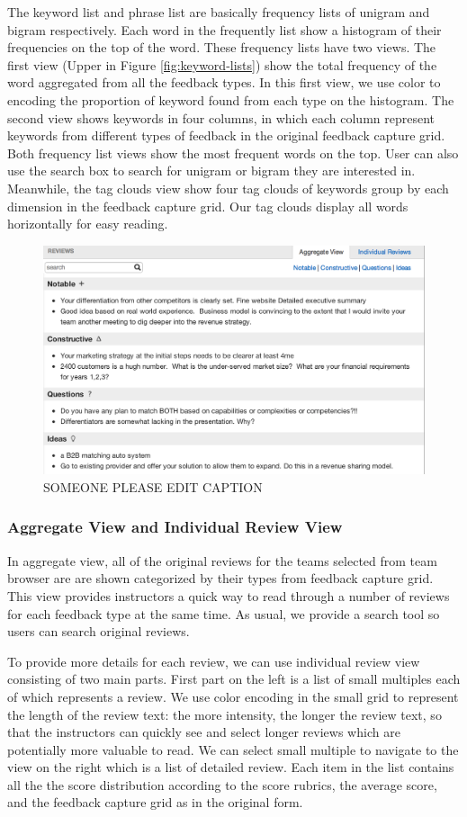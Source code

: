 \documentclass{sigchi}
\begin{document}
The keyword list and phrase list are basically frequency lists of unigram and
bigram respectively.  Each word in the frequently list show a histogram of their
frequencies on the top of the word.  These frequency lists have two views.  The
first view (Upper in Figure \ref{fig:keyword-lists}) show the total frequency of the
word aggregated from all the feedback types.  In this first view, we use color
to encoding the proportion of keyword found from each type on the histogram.
The second view shows keywords in four columns, in which each column represent
keywords from different types of feedback in the original feedback capture grid.
Both frequency list views show the most frequent words on the top.  User can
also use the search box to search for unigram or bigram they are interested in.
Meanwhile, the tag clouds view show four tag clouds of keywords group by each
dimension in the feedback capture grid.  Our tag clouds display all words
horizontally for easy reading.


\begin{figure}[h]
\centering
\includegraphics[width=0.8\columnwidth]{images/aggregate-view}
\caption{SOMEONE PLEASE EDIT CAPTION}
\label{fig:aggregate-view}
\end{figure}

\subsubsection{Aggregate View and Individual Review View}

In aggregate view, all of the original reviews for the teams selected from team
browser are are shown categorized by their types from feedback capture grid.
This view provides instructors a quick way to read through a number of reviews
for each feedback type at the same time. As usual, we provide a search tool so
users can search original reviews.

To provide more details for each review, we can use individual review view
consisting of two main parts. First part on the left is a list of small
multiples each of which represents a review. We use color encoding in the small
grid to represent the length of the review text: the more intensity, the longer
the review text, so that the instructors can quickly see and select longer
reviews which are potentially more valuable to read. We can select small
multiple to navigate to the view on the right which is a list of detailed
review. Each item in the list contains all the the score distribution according
to the score rubrics, the average score, and the feedback capture grid as in the
original form.
\end{document}
